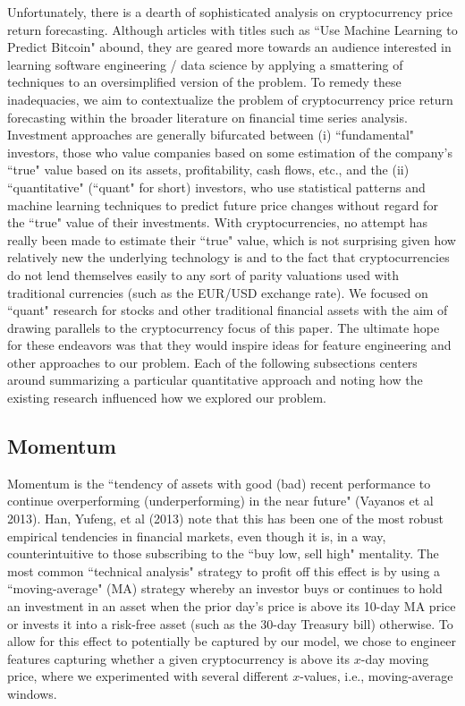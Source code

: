 \documentclass[12pt,twoside]{article}
\begin{document}
Unfortunately, there is a dearth of sophisticated analysis on cryptocurrency price return forecasting. Although articles with titles such as ``Use Machine Learning to Predict Bitcoin" abound, they are geared more towards an audience interested in learning software engineering / data science by applying a smattering of techniques to an oversimplified version of the problem. To remedy these inadequacies, we aim to contextualize the problem of cryptocurrency price return forecasting within the broader literature on financial time series analysis.
\bigbreak
Investment approaches are generally bifurcated between (i) ``fundamental" investors, those who value companies based on some estimation of the company's ``true" value based on its assets, profitability, cash flows, etc., and the (ii) ``quantitative" (``quant" for short) investors, who use statistical patterns and machine learning techniques to predict future price changes without regard for the ``true" value of their investments. With cryptocurrencies, no attempt has really been made to estimate their ``true" value, which is not surprising given how relatively new the underlying technology is and to the fact that cryptocurrencies do not lend themselves easily to any sort of parity valuations used with traditional currencies (such as the EUR/USD exchange rate). We focused on ``quant" research for stocks and other traditional financial assets with the aim of drawing parallels to the cryptocurrency focus of this paper. The ultimate hope for these endeavors was that they would inspire ideas for feature engineering and other approaches to our problem. Each of the following subsections centers around summarizing a particular quantitative approach and noting how the existing research influenced how we explored our problem.
\subsection{Momentum}
Momentum is the ``tendency of assets with good (bad) recent performance to continue overperforming (underperforming) in the near future" (Vayanos et al 2013). Han, Yufeng, et al (2013) note that this has been one of the most robust empirical tendencies in financial markets, even though it is, in a way, counterintuitive to those subscribing to the ``buy low, sell high" mentality. The most common ``technical analysis" strategy to profit off this effect is by using a ``moving-average" (MA) strategy whereby an investor buys or continues to hold an investment in an asset when the prior day's price is above its 10-day MA price or invests it into a risk-free asset (such as the 30-day Treasury bill) otherwise. To allow for this effect to potentially be captured by our model, we chose to engineer features capturing whether a given cryptocurrency is above its $x$-day moving price, where we experimented with several different $x$-values, i.e., moving-average windows.
\end{document}
